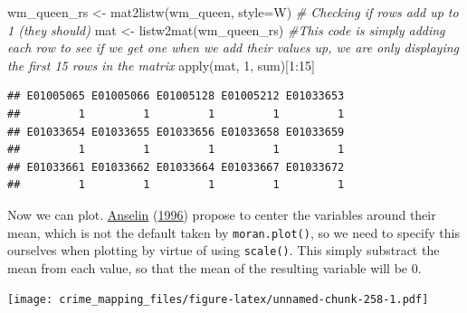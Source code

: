 \documentclass[
  krantz2]{krantz}
\makeatletter
\newenvironment{Shaded}{\begin{snugshade}}{\end{snugshade}}
\newcommand{\AttributeTok}[1]{\textcolor[rgb]{0.61,0.61,0.61}{#1}}
\newcommand{\CommentTok}[1]{\textcolor[rgb]{0.37,0.37,0.37}{\textit{#1}}}
\newcommand{\DecValTok}[1]{\textcolor[rgb]{0.06,0.06,0.06}{#1}}
\newcommand{\FunctionTok}[1]{\textcolor[rgb]{0,0,0}{#1}}
\newcommand{\NormalTok}[1]{#1}
\newcommand{\OtherTok}[1]{\textcolor[rgb]{0.37,0.37,0.37}{#1}}
\newcommand{\SpecialCharTok}[1]{\textcolor[rgb]{0,0,0}{#1}}
\newcommand{\StringTok}[1]{\textcolor[rgb]{0.5,0.5,0.5}{#1}}
\newenvironment{kframe}{%
\medskip{}
\setlength{\fboxsep}{.8em}
 \def\at@end@of@kframe{}%
 \ifinner\ifhmode%
  \def\at@end@of@kframe{\end{minipage}}%
  \begin{minipage}{\columnwidth}%
 \fi\fi%
 \def\FrameCommand##1{\hskip\@totalleftmargin \hskip-\fboxsep
 \colorbox{shadecolor}{##1}\hskip-\fboxsep
     \hskip-\linewidth \hskip-\@totalleftmargin \hskip\columnwidth}%
 \MakeFramed {\advance\hsize-\width
   \@totalleftmargin\z@ \linewidth\hsize
   \@setminipage}}%
 {\par\unskip\endMakeFramed%
 \at@end@of@kframe}
\renewenvironment{Shaded}{\begin{kframe}}{\end{kframe}}
\makeatother
\begin{document}
\begin{Shaded}
\begin{Highlighting}[]
\NormalTok{wm\_queen\_rs }\OtherTok{\textless{}{-}} \FunctionTok{mat2listw}\NormalTok{(wm\_queen, }\AttributeTok{style=}\StringTok{\textquotesingle{}W\textquotesingle{}}\NormalTok{)}
\CommentTok{\# Checking if rows add up to 1 (they should)}
\NormalTok{mat }\OtherTok{\textless{}{-}} \FunctionTok{listw2mat}\NormalTok{(wm\_queen\_rs)}
\CommentTok{\#This code is simply adding each row to see if we get one when we add their values up, we are only displaying the first 15 rows in the matrix}
\FunctionTok{apply}\NormalTok{(mat, }\DecValTok{1}\NormalTok{, sum)[}\DecValTok{1}\SpecialCharTok{:}\DecValTok{15}\NormalTok{]}
\end{Highlighting}
\end{Shaded}

\begin{verbatim}
## E01005065 E01005066 E01005128 E01005212 E01033653 
##         1         1         1         1         1 
## E01033654 E01033655 E01033656 E01033658 E01033659 
##         1         1         1         1         1 
## E01033661 E01033662 E01033664 E01033667 E01033672 
##         1         1         1         1         1
\end{verbatim}

Now we can plot. \protect\hyperlink{ref-Anselin_1996}{Anselin} (\protect\hyperlink{ref-Anselin_1996}{1996}) propose to center the variables around their mean, which is not the default taken by \texttt{moran.plot()}, so we need to specify this ourselves when plotting by virtue of using \texttt{scale()}. This simply substract the mean from each value, so that the mean of the resulting variable will be 0.

\begin{Shaded}
\end{Shaded}

\texttt{[image: crime\_mapping\_files/figure-latex/unnamed-chunk-258-1.pdf]}
\end{document}
